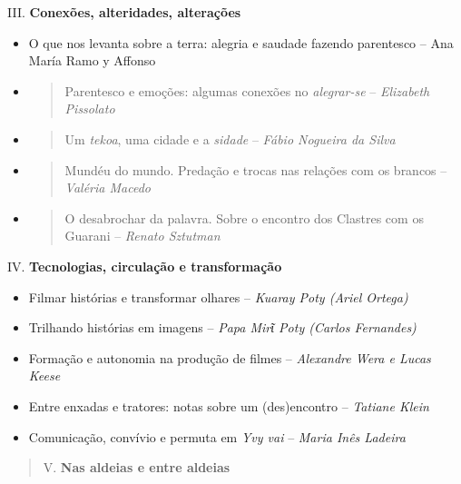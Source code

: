 III. \textbf{Conexões, alteridades, alterações}

\begin{itemize}
\item
  O que nos levanta sobre a terra: alegria e saudade fazendo parentesco
  -- Ana María Ramo y Affonso
\end{itemize}

\begin{itemize}
\item
  \begin{quote}
  Parentesco e emoções: algumas conexões no \emph{alegrar-se} --
  \emph{Elizabeth Pissolato}
  \end{quote}
\item
  \begin{quote}
  Um \emph{tekoa}, uma cidade e a \emph{sidade} -- \emph{Fábio Nogueira
  da Silva}
  \end{quote}
\item
  \begin{quote}
  Mundéu do mundo. Predação e trocas nas relações com os brancos --
  \emph{Valéria Macedo}
  \end{quote}
\item
  \begin{quote}
  O desabrochar da palavra. Sobre o encontro dos Clastres com os Guarani
  -- \emph{Renato Sztutman}
  \end{quote}
\end{itemize}

IV. \textbf{Tecnologias, circulação e transformação}

\begin{itemize}
\item
  Filmar histórias e transformar olhares -- \emph{Kuaray Poty (Ariel
  Ortega)}
\item
  Trilhando histórias em imagens -- \emph{Papa Mirῖ Poty (Carlos
  Fernandes)}
\item
  Formação e autonomia na produção de filmes -- \emph{Alexandre Wera e
  Lucas Keese}
\item
  Entre enxadas e tratores: notas sobre um (des)encontro --
  \emph{Tatiane Klein}
\item
  Comunicação, convívio e permuta em \emph{Yvy vai} -- \emph{Maria Inês
  Ladeira}
\end{itemize}

\begin{quote}
V. \textbf{Nas aldeias e entre aldeias}
\end{quote}

